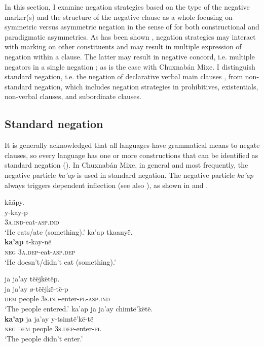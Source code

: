 \documentclass[output=paper,colorlinks,citecolor=brown,draft]{langscibook}
\begin{document}
In this section, I examine negation strategies based on the type of the negative marker(s) and the structure of the negative clause as a whole focusing on symmetric versus asymmetric negation in the sense of \citet{Miestamo2007,Miestamo2009neg.pragmatics,Miestamo2013-wals114,Miestamo2013-wals113,Miestamo2017} for both constructional and paradigmatic asymmetries. As has been shown \citep{Horn2010,KahrelBerg1994,Payne1997}, negation strategies may interact with marking on other constituents and may result in multiple expression of negation within a clause. The latter may result in negative concord, i.e. multiple negators in a single negation \citep{Horn2010}; as is the case with Chuxnabán Mixe. I distinguish standard negation, i.e. the negation of declarative verbal main clauses \citep{Miestamo2005}, from non-standard negation, which includes negation strategies in prohibitives, existentials, non\nobreakdash-verbal clauses, and subordinate clauses.

\subsection{Standard negation}\label{sec:mix:2.1}

It is generally acknowledged that all languages have grammatical means to negate clauses, so every language has one or more constructions that can be identified as standard negation (\citealt{Miestamo2005,Miestamo2007}). In Chuxnabán Mixe, in general and most frequently, the negative particle \textit{ka’ap} is used in standard negation. The negative particle \textit{ka’ap} always triggers dependent inflection (see also ), as shown in  and .

\ea\label{ex:mix:3}
    \ea\label{ex:mix:3a}
        \glll kääpy. \\
             y-kay-p \\
             \textsc{3a.ind}{}-eat-\textsc{asp.ind} \\
        \glt ‘He eats/ate (something).’
    \ex\label{ex:mix:3b}
        \glll  ka’ap tkaanyë.\\ 
              \textbf{ka’ap} t-kay-në\\
              \textsc{neg} \textsc{3a.dep}{}-eat-\textsc{asp.dep}\\
        \glt ‘He doesn’t/didn’t eat (something).’
    \z
\z 

\ea\label{ex:mix:4}
    \ea\label{ex:mix:4a}
        \glll ja ja’ay tëëjkëtëp. \\
             ja ja’ay ø-tëëjkë-të-p \\
             \textsc{dem} people 3\textsc{s.ind}{}-enter-\textsc{pl-asp.ind}  \\
        \glt ‘The people entered.’    
    \ex\label{ex:mix:4b}
        \glll ka’ap ja ja’ay chimtë’këtë.\\ 
             \textbf{ka’ap} ja ja’ay y-tsimtë’kë{}-të \\
             \textsc{neg} \textsc{dem} people 3\textsc{s.dep}{}-enter-\textsc{pl} \\
        \glt ‘The people didn’t enter.’
    \z
\z 
\end{document}

